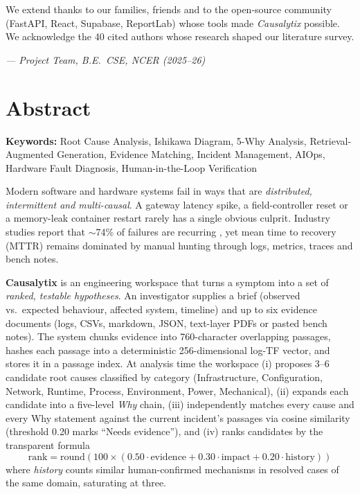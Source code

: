 \documentclass[12pt,a4paper,oneside]{report}
\begin{document}
We extend thanks to our families, friends and to the open-source community (FastAPI, React, Supabase, ReportLab) whose tools made \textit{Causalytix} possible. We acknowledge the 40 cited authors whose research shaped our literature survey.

\vspace{0.5cm}
\begin{flushright}
\textit{--- Project Team, B.E.\ CSE, NCER (2025--26)}
\end{flushright}

\chapter*{Abstract}
\noindent \textbf{Keywords:} Root Cause Analysis, Ishikawa Diagram, 5-Why Analysis, Retrieval-Augmented Generation, Evidence Matching, Incident Management, AIOps, Hardware Fault Diagnosis, Human-in-the-Loop Verification

\vspace{0.3cm}
Modern software and hardware systems fail in ways that are \textit{distributed, intermittent and multi-causal}. A gateway latency spike, a field-controller reset or a memory-leak container restart rarely has a single obvious culprit. Industry studies report that $\sim$74\% of failures are recurring \cite{wang2024comprehensive}, yet mean time to recovery (MTTR) remains dominated by manual hunting through logs, metrics, traces and bench notes.

\textbf{Causalytix} is an engineering workspace that turns a symptom into a set of \textit{ranked, testable hypotheses}. An investigator supplies a brief (observed vs.\ expected behaviour, affected system, timeline) and up to six evidence documents (logs, CSVs, markdown, JSON, text-layer PDFs or pasted bench notes). The system chunks evidence into 760-character overlapping passages, hashes each passage into a deterministic 256-dimensional log-TF vector, and stores it in a passage index. At analysis time the workspace (i) proposes 3--6 candidate root causes classified by category (Infrastructure, Configuration, Network, Runtime, Process, Environment, Power, Mechanical), (ii) expands each candidate into a five-level \textit{Why} chain, (iii) independently matches every cause and every Why statement against the current incident's passages via cosine similarity (threshold 0.20 marks ``Needs evidence''), and (iv) ranks candidates by the transparent formula \[ \text{rank}= \text{round}(100\times(0.50\cdot\text{evidence}+0.30\cdot\text{impact}+0.20\cdot\text{history})) \] where \textit{history} counts similar human-confirmed mechanisms in resolved cases of the same domain, saturating at three.
\end{document}
